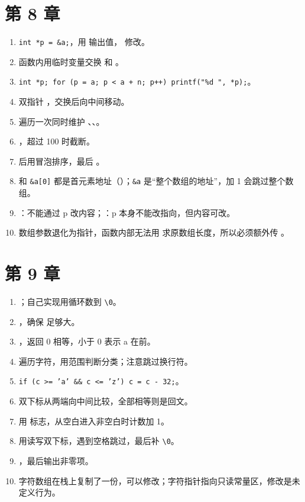 \section{第 8 章}

\begin{enumerate}
  \item \texttt{int *p = \&a;}，用  输出值， 修改。
  \item 函数内用临时变量交换  和 。
  \item \texttt{int *p; for (p = a; p < a + n; p++) printf("\%d ", *p);}。
  \item 双指针 ，交换后向中间移动。
  \item 遍历一次同时维护 、、。
  \item {}，超过 100 时截断。
  \item {} 后用冒泡排序，最后 。
  \item {} 和 \texttt{\&a[0]} 都是首元素地址（）；\texttt{\&a} 是“整个数组的地址”，加 1 会跳过整个数组。
  \item {}：不能通过 p 改内容；：p 本身不能改指向，但内容可改。
  \item 数组参数退化为指针，函数内部无法用  求原数组长度，所以必须额外传 。
\end{enumerate}

\section{第 9 章}

\begin{enumerate}
  \item {}；自己实现用循环数到 \texttt{\textbackslash0}。
  \item {}，确保  足够大。
  \item {}，返回 0 相等，小于 0 表示 a 在前。
  \item 遍历字符，用范围判断分类；注意跳过换行符。
  \item \texttt{if (c >= 'a' \&\& c <= 'z') c = c - 32;}。
  \item 双下标从两端向中间比较，全部相等则是回文。
  \item 用  标志，从空白进入非空白时计数加 1。
  \item 用读写双下标，遇到空格跳过，最后补 \texttt{\textbackslash0}。
  \item {}，最后输出非零项。
  \item 字符数组在栈上复制了一份，可以修改；字符指针指向只读常量区，修改是未定义行为。
\end{enumerate}

